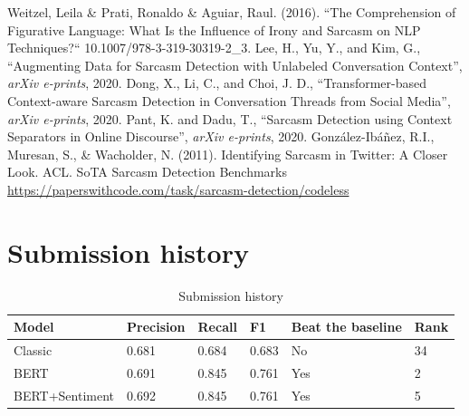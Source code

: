 \documentclass[conference]{IEEEtran}
\begin{document}
\begin{thebibliography}{00}
	 Weitzel, Leila \& Prati, Ronaldo \& Aguiar, Raul. (2016). ``The Comprehension of Figurative Language: What Is the Influence of Irony and Sarcasm on NLP Techniques?`` 10.1007/978-3-319-30319-2\_3. 
	 Lee, H., Yu, Y., and Kim, G., “Augmenting Data for Sarcasm Detection with Unlabeled Conversation Context”, \textit{arXiv e-prints}, 2020.
	 Dong, X., Li, C., and Choi, J. D., “Transformer-based Context-aware Sarcasm Detection in Conversation Threads from Social Media”, \textit{arXiv e-prints}, 2020.
	 Pant, K. and Dadu, T., “Sarcasm Detection using Context Separators in Online Discourse”, \textit{arXiv e-prints}, 2020.
	 González-Ibáñez, R.I., Muresan, S., \& Wacholder, N. (2011). Identifying Sarcasm in Twitter: A Closer Look. ACL.
	 SoTA Sarcasm Detection Benchmarks \url{https://paperswithcode.com/task/sarcasm-detection/codeless}
\end{thebibliography}
\appendices
\section{Submission history}
\begin{table}[htbp]
	\caption{Submission history}
	\begin{center}
		\begin{tabular}{|l|l|l|l|l|l|}
			\hline
			\textbf{Model} & \textbf{Precision} & \textbf{Recall} & \textbf{F1} & \textbf{Beat the baseline} & \textbf{Rank} \\ \hline
			Classic & 0.681 & 0.684 & 0.683 & No  & 34 \\ \hline
			BERT & 0.691 & 0.845 & 0.761 & Yes  & 2 \\ \hline
			BERT+Sentiment & 0.692 & 0.845 & 0.761 & Yes & 5 \\ \hline
		\end{tabular}
		\label{tab3}
	\end{center}
\end{table}
\end{document}
